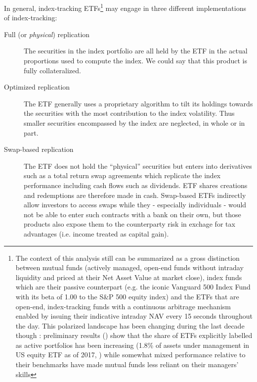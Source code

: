 In general, index-tracking ETFs\footnote{The context of this analysis still can be summarized as a gross distinction between mutual funds (actively managed, open-end funds without intraday liquidity and priced at their Net Asset Value at market close), index funds which are their passive counterpart (e.g. the iconic Vanguard 500 Index Fund with its beta of 1.00 to the S\&P 500 equity index) and the ETFs that are open-end, index-tracking funds with a continuous arbitrage mechanism enabled by issuing their indicative intraday NAV every 15 seconds throughout the day. This polarized landscape has been changing during the last decade though : preliminary results (\cite{Easley2018}) show that the share of ETFs explicitly labelled as active portfolios has been increasing (1.8\% of assets under management in US equity ETF as of 2017, \cite{Ben-David2017}) while somewhat mixed performance relative to their benchmarks have made mutual funds less reliant on their managers' skills} may engage in three different implementations of index-tracking:
\begin{description}
\item[Full (or \textit{physical}) replication] The securities in the index portfolio are all held by the ETF in the actual proportions used to compute the index. We could say that this product is fully collateralized. 
\item[Optimized replication] The ETF generally uses a proprietary algorithm to tilt its holdings towards the securities with the most contribution to the index volatility. Thus smaller securities encompassed by the index are neglected, in whole or in part.
  \item[Swap-based replication] The ETF does not hold the ``physical'' securities but enters into derivatives such as a total return swap agreements which replicate the index performance including cash flows such as dividends. ETF shares creations and redemptions are therefore made in cash. Swap-based ETFs indirectly allow investors to access swaps while they - especially individuals - would not be able to enter such contracts with a bank on their own, but those products also expose them to the counterparty risk in exchage for tax advantages (i.e. income treated as capital gain). 
\end{description}
